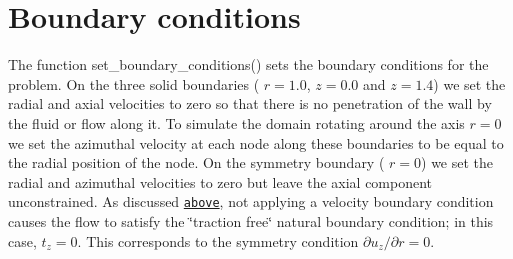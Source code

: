  

\hypertarget{index_set_boundary_conditions}{}\section{Boundary conditions}\label{index_set_boundary_conditions}
The function {\ttfamily set\+\_\+boundary\+\_\+conditions()} sets the boundary conditions for the problem. On the three solid boundaries ( $ r = 1.0 $, $ z = 0.0 $ and $ z = 1.4 $) we set the radial and axial velocities to zero so that there is no penetration of the wall by the fluid or flow along it. To simulate the domain rotating around the axis $ r = 0 $ we set the azimuthal velocity at each node along these boundaries to be equal to the radial position of the node. On the symmetry boundary ( $ r = 0 $) we set the radial and azimuthal velocities to zero but leave the axial component unconstrained. As discussed \href{#equations}{\tt above}, not applying a velocity boundary condition causes the flow to satisfy the \char`\"{}traction
free\char`\"{} natural boundary condition; in this case, $ t_z = 0 $. This corresponds to the symmetry condition $ \partial u_z /\partial r = 0 $.


